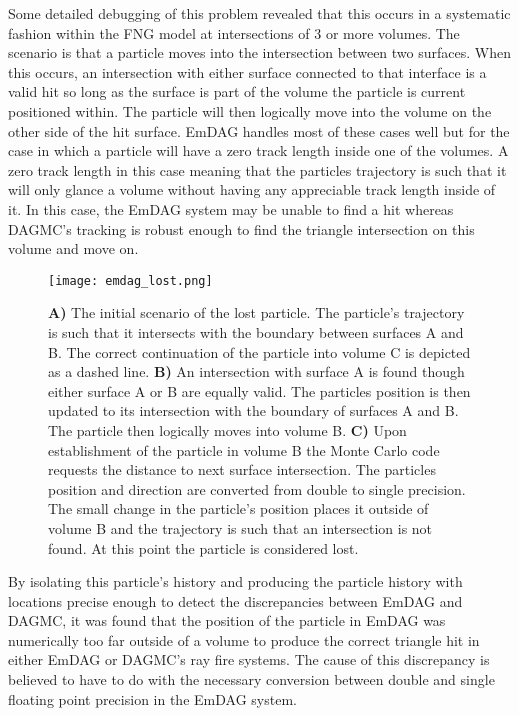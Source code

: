 Some detailed debugging of this problem revealed that this occurs in a
systematic fashion within the FNG model at intersections of 3 or more
volumes. The scenario is that a particle moves into the intersection between two
surfaces. When this occurs, an intersection with either surface connected to
that interface is a valid hit so long as the surface is part of the volume the
particle is current positioned within. The particle will then logically move
into the volume on the other side of the hit surface. EmDAG handles most of
these cases well but for the case in which a particle will have a zero track
length inside one of the volumes. A zero track length in this case meaning that
the particles trajectory is such that it will only glance a volume without
having any appreciable track length inside of it. In this case, the EmDAG system
may be unable to find a hit whereas DAGMC's tracking is robust enough to find
the triangle intersection on this volume and move on.

\begin{figure}[h!]
  \begin{centering}
    \texttt{[image: emdag\_lost.png]}
    \caption{\textbf{A)} The initial scenario of the lost particle. The
      particle's trajectory is such that it intersects with the boundary between
      surfaces A and B. The correct continuation of the particle into volume C
      is depicted as a dashed line. \textbf{B)} An intersection with surface A
      is found though either surface A or B are equally valid. The particles
      position is then updated to its intersection with the boundary of surfaces
      A and B. The particle then logically moves into volume B. \textbf{C)} Upon
      establishment of the particle in volume B the Monte Carlo code requests
      the distance to next surface intersection. The particles position and
      direction are converted from double to single precision. The small change
      in the particle's position places it outside of volume B and the
      trajectory is such that an intersection is not found. At this point the
      particle is considered lost.}
    \label{emdag-lost-particles}
  \end{centering}
  \end{figure}

By isolating this particle's history and producing the particle history with
locations precise enough to detect the discrepancies between EmDAG and DAGMC, it
was found that the position of the particle in EmDAG was numerically too far
outside of a volume to produce the correct triangle hit in either EmDAG or
DAGMC's ray fire systems. The cause of this discrepancy is believed to have to
do with the necessary conversion between double and single floating point
precision in the EmDAG system.

